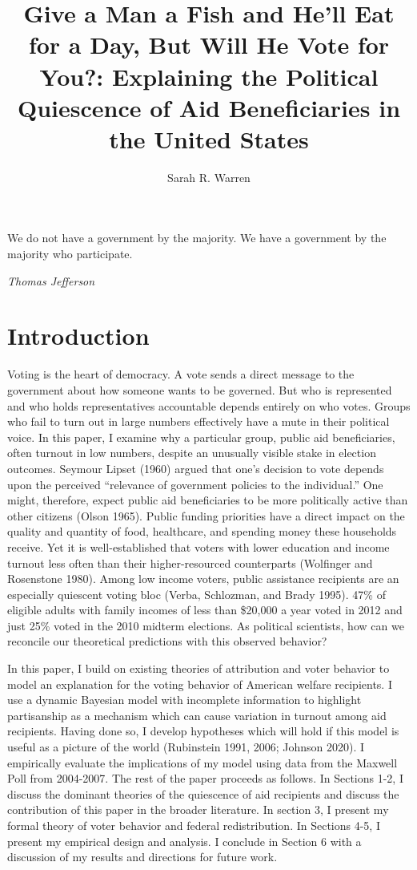 \documentclass[12pt]{paper}
\title{Give a Man a Fish and He'll Eat for a Day, But Will He Vote for You?: Explaining the Political Quiescence of Aid Beneficiaries in the United States}
\author{Sarah R. Warren}
\date{}
\begin{document}
\maketitle

\setlength{}
\epigraph{We do not have a government by the majority. We have a government by the majority who participate.}{\textit{Thomas Jefferson}}

\section*{Introduction}
Voting is the heart of democracy. A vote sends a direct message to the government about how someone wants to be governed. But who is represented and who holds representatives accountable depends entirely on who votes. Groups who fail to turn out in large numbers effectively have a mute in their political voice. In this paper, I examine why a particular group, public aid beneficiaries, often turnout in low numbers, despite an unusually visible stake in election outcomes. Seymour Lipset (1960) argued that one's decision to vote depends upon the perceived “relevance of government policies to the individual.” One might, therefore, expect public aid beneficiaries to be more politically active than other citizens (Olson 1965). Public funding priorities have a direct impact on the quality and quantity of food, healthcare, and spending money these households receive. Yet it is well-established that voters with lower education and income turnout less often than their higher-resourced counterparts (Wolfinger and Rosenstone 1980). Among low income voters, public assistance recipients are an especially quiescent voting bloc (Verba, Schlozman, and Brady 1995). 47\% of eligible adults with family incomes of less than \$20,000 a year voted in 2012 and just 25\% voted in the 2010 midterm elections. As political scientists, how can we reconcile our theoretical predictions with this observed behavior?

In this paper, I build on existing theories of attribution and voter behavior to model an explanation for the voting behavior of American welfare recipients. I use a dynamic Bayesian model with incomplete information to highlight partisanship as a mechanism which can cause variation in turnout among aid recipients. Having done so, I develop hypotheses which will hold if this model is useful as a picture of the world (Rubinstein 1991, 2006; Johnson 2020). I empirically evaluate the implications of my model using data from the Maxwell Poll from 2004-2007. The rest of the paper proceeds as follows. In Sections 1-2, I discuss the dominant theories of the quiescence of aid recipients and discuss the contribution of this paper in the broader literature. In section 3, I present my formal theory of voter behavior and federal redistribution. In Sections 4-5, I present my empirical design and analysis. I conclude in Section 6 with a discussion of my results and directions for future work.
\end{document}
